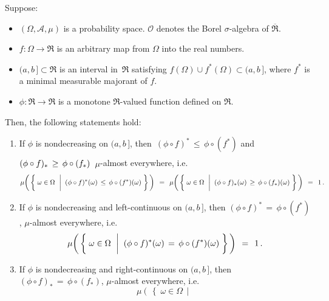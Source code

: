 \begin{lemma}
\mbox{}\vskip 0.1cm
\noindent
Suppose:
\begin{itemize}
\item
	$(\Omega,\mathcal{A},\mu)$ is a probability space.
	$\mathcal{O}$ denotes the Borel $\sigma$-algebra of $\overline{\Re}$.
\item
	$f : \Omega \longrightarrow \Re$ is an arbitrary map from $\Omega$ into the real numbers.
\item
	$(a,b\,] \subset \Re$ is an interval in \,$\Re$ satisfying $f(\Omega) \cup f^{*}(\Omega) \subset (a,b\,]$,
	where $f^{*}$ is a minimal measurable majorant of $f$.
\item
	$\phi : \Re \longrightarrow \Re$ is a monotone $\Re$-valued function defined on $\Re$.
\end{itemize}
Then, the following statements hold:
\begin{enumerate}
\item
	If $\phi$ is nondecreasing on $(a,b\,]$, then
	\,$(\phi \circ f)^{*} \,\leq\, \phi \circ (f^{*})$
	\;and\;
	$(\phi \circ f)_{*} \,\overset{{\color{white}\vert}}{\geq}\, \phi \circ (f_{*})$
	\,$\mu$-almost everywhere, i.e.
	\begin{equation*}
	\mu\!\left(\,\left\{\;
		\omega \in \Omega
		\,\;\left\vert\;\;
		(\phi \circ f)^{*}(\omega) \,\overset{{\color{white}\vert}}{\leq}\, \phi \circ (f^{*})(\omega)
		\right.
	\,\right\}\,\right)
	\,\;=\;\,
	\mu\!\left(\,\left\{\;
		\omega \in \Omega
		\,\;\left\vert\;\;
		(\phi \circ f)_{*}(\omega) \,\overset{{\color{white}\vert}}{\geq}\, \phi \circ (f_{*})(\omega)
		\right.
	\,\right\}\,\right)
	\,\;=\;\, 1\,.
	\end{equation*}
\item
	If $\phi$ is nondecreasing and left-continuous on $(a,b\,]$, then
	$(\phi \circ f)^{*} \,=\, \phi \circ (f^{*})$, $\mu$-almost everywhere, i.e.
	\begin{equation*}
	\mu\!\left(\,\left\{\;
		\omega \in \Omega
		\,\;\left\vert\;\;
		(\phi \circ f)^{*}(\omega) \,\overset{{\color{white}\vert}}{=}\, \phi \circ (f^{*})(\omega)
		\right.
	\,\right\}\,\right)
	\,\;=\;\, 1\,.
	\end{equation*}
\item
	If $\phi$ is nondecreasing and right-continuous on $(a,b\,]$, then
	$(\phi \circ f)_{*} \,=\, \phi \circ (f_{*})$, $\mu$-almost everywhere, i.e.
	\begin{equation*}
	\mu\!\left(\,\left\{\;
		\omega \in \Omega
		\,\;\left\vert\;\;

\end{equation*}
\end{enumerate}
\end{lemma}
